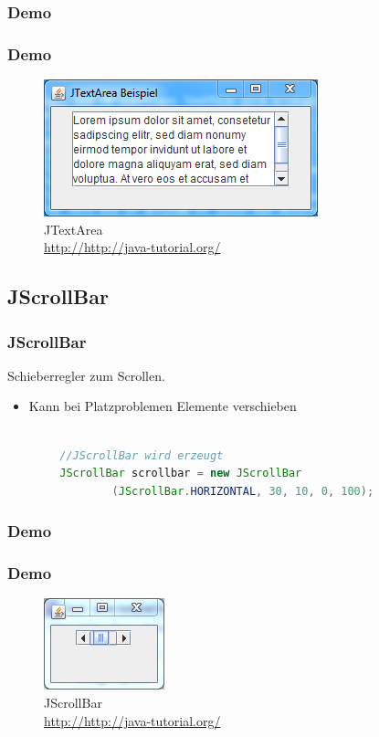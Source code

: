 \documentclass[xcolor=dvipsnames]{beamer}
\begin{document}
\subsubsection{Demo}
\begin{frame}
  \frametitle{Demo}
	\begin{figure}
		\includegraphics[scale=1.0]{images/jtextarea.PNG}
		\caption{JTextArea \\ \tiny{\textcolor{gray}{\url{http://http://java-tutorial.org/}}}}
		\end{figure}
\end{frame}


\subsection{JScrollBar}
\begin{frame}  %
  \frametitle{JScrollBar
} %
  \begin{block}{Schieberregler zum Scrollen.}
	  \begin{itemize}
		\item Kann bei Platzproblemen Elemente verschieben
	  \end{itemize}
  \end{block}

\begin{lstlisting}[language=java,basicstyle=\scriptsize\ttfamily]

        //JScrollBar wird erzeugt
        JScrollBar scrollbar = new JScrollBar
                (JScrollBar.HORIZONTAL, 30, 10, 0, 100);

\end{lstlisting}

\end{frame}


\subsubsection{Demo}
\begin{frame}
  \frametitle{Demo}
	\begin{figure}
		\includegraphics[scale=1.0]{images/jscrollbar.PNG}
		\caption{JScrollBar \\ \tiny{\textcolor{gray}{\url{http://http://java-tutorial.org/}}}}
		\end{figure}
\end{frame}
\end{document}
